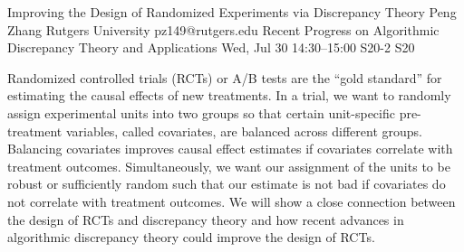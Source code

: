 \begin{talk}
  {Improving the Design of Randomized Experiments via Discrepancy Theory}%
  {Peng Zhang}%
  {Rutgers University}%
  {pz149@rutgers.edu}%
  {Recent Progress on Algorithmic Discrepancy Theory and Applications}%
  {}%
  {Wed, Jul 30 14:30–15:00}%
  {S20-2}%
  {S20}%
				
			
Randomized controlled trials (RCTs) or A/B tests are the ``gold standard'' for estimating the causal effects of new treatments. In a trial, we want to randomly assign experimental units into two groups so that certain unit-specific pre-treatment variables, called covariates, are balanced across different groups. Balancing covariates improves causal effect estimates if covariates correlate with treatment outcomes. Simultaneously, we want our assignment of the units to be robust or sufficiently random such that our estimate is not bad if covariates do not correlate with treatment outcomes. We will show a close connection between the design of RCTs and discrepancy theory and how recent advances in algorithmic discrepancy theory could improve the design of RCTs.

\medskip


\end{talk}

